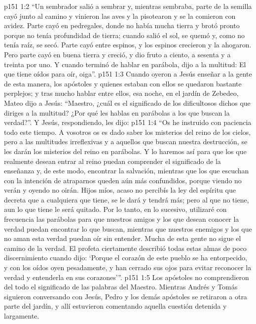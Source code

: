 \vs p151 1:2 \pc “Un sembrador salió a sembrar y, mientras sembraba, parte de la semilla cayó junto al camino y vinieron las aves y la pisotearon y se la comieron con avidez. Parte cayó en pedregales, donde no había mucha tierra y brotó pronto porque no tenía profundidad de tierra; cuando salió el sol, se quemó y, como no tenía raíz, se secó. Parte cayó entre espinos, y los espinos crecieron y la ahogaron. Pero parte cayó en buena tierra y creció, y dio fruto a ciento, a sesenta y a treinta por uno. Y cuando terminó de hablar en parábola, dijo a la multitud: El que tiene oídos para oír, oiga”.
\vs p151 1:3 \pc Cuando oyeron a Jesús enseñar a la gente de esta manera, los apóstoles y quienes estaban con ellos se quedaron bastante perplejos; y tras mucho hablar entre ellos, esa noche, en el jardín de Zebedeo, Mateo dijo a Jesús: “Maestro, ¿cuál es el significado de los dificultosos dichos que diriges a la multitud? ¿Por qué les hablas en parábolas a los que buscan la verdad?”. Y Jesús, respondiendo, les dijo:
\vs p151 1:4 “Os he instruido con paciencia todo este tiempo. A vosotros os es dado saber los misterios del reino de los cielos, pero a las multitudes irreflexivas y a aquellos que buscan nuestra destrucción, se les darán los misterios del reino en parábolas. Y lo haremos así para que los que realmente desean entrar al reino puedan comprender el significado de la enseñanza y, de este modo, encontrar la salvación, mientras que los que escuchan con la intención de atraparnos queden aún más confundidos, porque viendo no verán y oyendo no oirán. Hijos míos, acaso no percibís la ley del espíritu que decreta que a cualquiera que tiene, se le dará y tendrá más; pero al que no tiene, aun lo que tiene le será quitado. Por lo tanto, en lo sucesivo, utilizaré con frecuencia las parábolas para que nuestros amigos y los que desean conocer la verdad puedan encontrar lo que buscan, mientras que nuestros enemigos y los que no aman esta verdad puedan oír sin entender. Mucha de esta gente no sigue el camino de la verdad. El profeta ciertamente describió todas estas almas de poco discernimiento cuando dijo: ‘Porque el corazón de este pueblo se ha entorpecido, y con los oídos oyen pesadamente, y han cerrado sus ojos para evitar reconocer la verdad y entenderla en sus corazones’”.
\vs p151 1:5 Los apóstoles no comprendieron del todo el significado de las palabras del Maestro. Mientras Andrés y Tomás siguieron conversando con Jesús, Pedro y los demás apóstoles se retiraron a otra parte del jardín, y allí estuvieron comentando aquella cuestión detenida y largamente.
